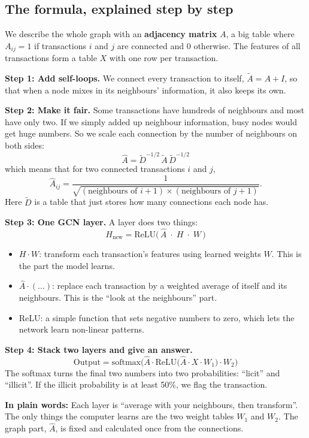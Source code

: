 \documentclass[11pt,a4paper]{article}
\newcommand{\Ahat}{\hat{A}}
\newcommand{\plain}[1]{\par\noindent\colorbox{notebg}{\parbox{\dimexpr\linewidth-2\fboxsep}{\small\textbf{In plain words:} #1}}\par}
\begin{document}
\subsection{The formula, explained step by step}
We describe the whole graph with an \textbf{adjacency matrix} $A$, a big table where $A_{ij}=1$ if transactions $i$ and $j$
are connected and 0 otherwise. The features of all transactions form a table $X$ with one row per transaction.

\textbf{Step 1: Add self-loops.} We connect every transaction to itself, $\tilde A = A + I$, so that when a node mixes in
its neighbours' information, it also keeps its own.

\textbf{Step 2: Make it fair.} Some transactions have hundreds of neighbours and most have only two. If we simply added up
neighbour information, busy nodes would get huge numbers. So we scale each connection by the number of neighbours on both
sides:
\[
  \Ahat = \tilde D^{-1/2}\,\tilde A\,\tilde D^{-1/2}
\]
which means that for two connected transactions $i$ and $j$,
\[
  \Ahat_{ij} = \frac{1}{\sqrt{(\text{neighbours of } i + 1)\times(\text{neighbours of } j + 1)}}.
\]
Here $\tilde D$ is a table that just stores how many connections each node has.

\textbf{Step 3: One GCN layer.} A layer does two things:
\[
  H_{\text{new}} = \mathrm{ReLU}\big(\,\Ahat \;\cdot\; H \;\cdot\; W\,\big)
\]
\begin{itemize}
  \item $H \cdot W$: transform each transaction's features using learned weights $W$. This is the part the model learns.
  \item $\Ahat \cdot (\dots)$: replace each transaction by a weighted average of itself and its neighbours. This is the
        ``look at the neighbours'' part.
  \item ReLU: a simple function that sets negative numbers to zero, which lets the network learn non-linear patterns.
\end{itemize}

\textbf{Step 4: Stack two layers and give an answer.}
\[
  \text{Output} = \mathrm{softmax}\Big(\Ahat \cdot \mathrm{ReLU}\big(\Ahat \cdot X \cdot W_1\big) \cdot W_2\Big)
\]
The softmax turns the final two numbers into two probabilities: ``licit'' and ``illicit''. If the illicit probability is at
least 50\%, we flag the transaction.

\plain{Each layer is ``average with your neighbours, then transform''. The only things the computer learns are the two
weight tables $W_1$ and $W_2$. The graph part, $\Ahat$, is fixed and calculated once from the connections.}
\end{document}
